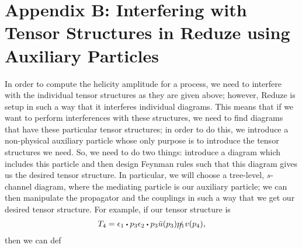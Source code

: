 \documentclass[12pt]{article}
\numberwithin{equation}{section}
\numberwithin{figure}{section}
\numberwithin{table}{section}
\newcommand{\ndot}{\mathrel{\raisebox{-2.3pt}{$ \!  \mathlarger{\mathlarger{\mathlarger{\mathlarger{\cdot}}}} \! $}}}
\begin{document}
        \section{Appendix B: Interfering with Tensor Structures in Reduze using Auxiliary Particles}

        In order to compute the helicity amplitude for a process, we need to interfere with the individual tensor structures as they are given above; however, Reduze is setup in such a way that it interferes individual diagrams. This means that if we want to perform interferences with these structures, we need to find diagrams that have these particular tensor structures; in order to do this, we introduce a non-physical auxiliary particle whose only purpose is to introduce the tensor structures we need. So, we need to do two things: introduce a diagram which includes this particle and then design Feynman rules such that this diagram gives us the desired tensor structure. In particular, we will choose a tree-level, \(s\)-channel diagram, where the mediating particle is our auxiliary particle; we can then manipulate the propagator and the couplings in such a way that we get our desired tensor structure. For example, if our tensor structure is 
	\begin{equation}
	T_4=\epsilon_1\ndot p_3\epsilon_2\ndot p_3\bar{u}(p_3)\slashed{p_1}v(p_4),
	\end{equation}
        then we can def
\end{document}
